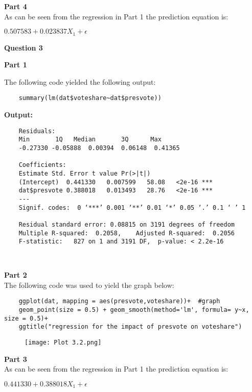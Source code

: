 \documentclass{article}
\begin{document}
\textbf{\large Part 4\\}
As can be seen from the regression in Part 1 the prediction equation is:
\begin{center}
	$ 0.507583 + 0.023837X_{1} + \epsilon $
\end{center} 
\pagebreak

	\textbf{\Large Question 3\\}
	
\noindent\textbf{\large Part 1\\}

The following code yielded the following output:\\
\begin{verbatim}
	summary(lm(dat$voteshare~dat$presvote))
\end{verbatim}
\textbf{Output:}
\begin{verbatim}
	Residuals:
	Min       1Q   Median       3Q      Max 
	-0.27330 -0.05888  0.00394  0.06148  0.41365 
	
	Coefficients:
	Estimate Std. Error t value Pr(>|t|)    
	(Intercept)  0.441330   0.007599   58.08   <2e-16 ***
	dat$presvote 0.388018   0.013493   28.76   <2e-16 ***
	---
	Signif. codes:  0 ‘***’ 0.001 ‘**’ 0.01 ‘*’ 0.05 ‘.’ 0.1 ‘ ’ 1
	
	Residual standard error: 0.08815 on 3191 degrees of freedom
	Multiple R-squared:  0.2058,	Adjusted R-squared:  0.2056 
	F-statistic:   827 on 1 and 3191 DF,  p-value: < 2.2e-16
	
	
\end{verbatim}


\textbf{\large Part 2\\}
The following code was used to yield the graph below:\\
\begin{verbatim}
	ggplot(dat, mapping = aes(presvote,voteshare))+  #graph
	geom_point(size = 0.5) + geom_smooth(method='lm', formula= y~x, size = 0.5)+
	ggtitle("regression for the impact of presvote on voteshare")
\end{verbatim}
\pagebreak
\begin{figure}[h]
	\centering
	\graphicspath{ {c:/Users/User/Documents/PostGrad/Stats/Assignment 3\Assignment 3} }
	\texttt{[image: Plot 3.2.png]}
	
\end{figure}





\textbf{\large Part 3\\}
As can be seen from the regression in Part 1 the prediction equation is:
\begin{center}
	$ 0.441330 + 0.388018X_{1} + \epsilon $
\end{center} 
\pagebreak
	
\end{document}
